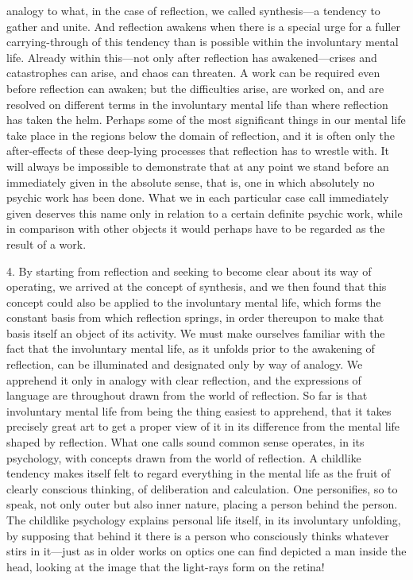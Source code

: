 \documentclass[12pt,a4paper]{book}
\newcommand{\opage}[1]{\marginnote{\footnotesize\textit{[#1]}}}
\begin{document}
analogy to what, in the case of reflection, we called synthesis---a
tendency to gather and unite. And reflection awakens when there is a
special urge for a fuller carrying-through of this tendency than is
possible within the involuntary mental life. Already within this---not
only after reflection has awakened---crises and catastrophes can arise,
and chaos can threaten. A work can be required even before reflection
can awaken; but the difficulties arise, are worked on, and are resolved
on different terms in the involuntary mental life than where reflection
has taken the helm. Perhaps some of the most significant things in our
mental life take place in the regions below the domain of reflection,
and it is often only the after-effects of these deep-lying processes
that reflection has to wrestle with. It will always be impossible to
demonstrate that at any point we stand before an immediately given in
the absolute sense, that is, one in which absolutely no psychic work has
been done. What we in each particular case call immediately given
deserves this name only in relation to a certain definite psychic work,
while in comparison with other objects it would perhaps have to be
regarded as the result of a work.

4. By starting from reflection and seeking to become clear about its way
of operating, we arrived at the concept of synthesis, and we then found
that this concept could also be applied to the involuntary mental life,
which forms the constant basis from which reflection springs, in order
thereupon \opage{11}to make that basis itself an object of its activity. We must
make ourselves familiar with the fact that the involuntary mental life,
as it unfolds prior to the awakening of reflection, can be illuminated
and designated only by way of analogy. We apprehend it only in analogy
with clear reflection, and the expressions of language are throughout
drawn from the world of reflection. So far is that involuntary mental
life from being the thing easiest to apprehend, that it takes precisely
great art to get a proper view of it in its difference from the mental
life shaped by reflection. What one calls sound common sense operates,
in its psychology, with concepts drawn from the world of reflection. A
childlike tendency makes itself felt to regard everything in the mental
life as the fruit of clearly conscious thinking, of deliberation and
calculation. One personifies, so to speak, not only outer but also inner
nature, placing a person behind the person. The childlike psychology
explains personal life itself, in its involuntary unfolding, by
supposing that behind it there is a person who consciously thinks
whatever stirs in it---just as in older works on optics one can find
depicted a man inside the head, looking at the image that the light-rays
form on the retina!
\end{document}
